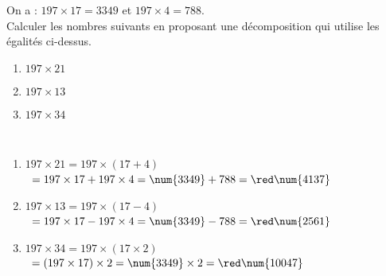 \begin{exercice*} %
   On a : $197\times17 =\num{3349}$ et $197\times4 =788$. \\
   Calculer les nombres suivants en proposant une décomposition qui utilise les égalités ci-dessus.
   \begin{enumerate}
      \item $197\times21$
      \item $197\times13$
      \item $197\times34$
   \end{enumerate}
\end{exercice*}

\begin{corrige}
   \ \\ [-5mm]
   \begin{enumerate}
      \item $197\times21 =197\times(17+4) $\\
         \quad\, $=197\times17+197\times4 =\num{3349}+788 =\red\num{4137}$
      \item $197\times13 =197\times(17-4)$ \\
         \quad\, $=197\times17-197\times4 =\num{3349}-788 =\red\num{2561}$
     \item $197\times34 =197\times(17\times2)$ \\
         \quad\, $=(197\times17)\times2 =\num{3349}\times2 =\red\num{10047}$
   \end{enumerate}
\end{corrige}
